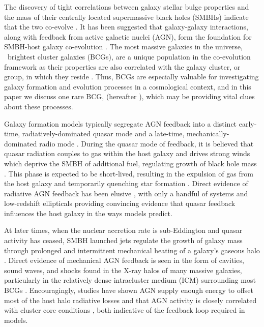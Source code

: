 \documentclass[useAMS,usenatbib]{mn2e}
\begin{document}
The discovery of tight correlations between galaxy stellar bulge
properties and the mass of their centrally located supermassive black
holes (SMBHs) indicate that the two co-evolve
\citep[\eg][]{1995ARA&A..33..581K, magorrian, 2000ApJ...539L...9F,
  2000ApJ...539L..13G, 2001ApJ...563L..11G}. It has been suggested
that galaxy-galaxy interactions, along with feedback from active
galactic nuclei (AGN), form the foundation for SMBH-host galaxy
co-evolution \citep[\eg][]{1995MNRAS.276..663B, 1998A&A...331L...1S,
  2000MNRAS.311..576K, 2001MNRAS.324..757G}. The most massive galaxies
in the universe, \eg\ brightest cluster galaxies (BCGs), are a unique
population in the co-evolution framework as their properties are also
correlated with the galaxy cluster, or group, in which they reside
\citep[\eg][]{1984ApJ...276...38J, 1998ApJ...502..141D}. Thus, BCGs
are especially valuable for investigating galaxy formation and
evolution processes in a cosmological context, and in this paper we
discuss one rare BCG, \object{\inine} (hereafter \irs), which may be
providing vital clues about these processes.

Galaxy formation models typically segregate AGN feedback into a
distinct early-time, radiatively-dominated quasar mode
\citep[\eg][]{2005Natur.435..629S, 2006ApJS..163....1H} and a
late-time, mechanically-dominated radio mode \citep[\eg][]{croton06,
  bower06}. During the quasar mode of feedback, it is believed that
quasar radiation couples to gas within the host galaxy and drives
strong winds which deprive the SMBH of additional fuel, regulating
growth of black hole mass \citep[\eg][]{2005ApJ...630..705H,
  2005Natur.433..604D}. This phase is expected to be short-lived,
resulting in the expulsion of gas from the host galaxy and temporarily
quenching star formation \citep[\eg][]{2006ApJ...642L.107N,
  2008ApJ...686..219M}. Direct evidence of radiative AGN feedback has
been elusive \citep[see][for a review]{2005ARA&A..43..769V}, with only
a handful of systems \citep[\eg][]{2008A&A...492...81P,
  2010A&A...518L.155F} and low-redshift ellipticals
\citep{2009ApJ...690.1672S} providing convincing evidence that quasar
feedback influences the host galaxy in the ways models predict.

At later times, when the nuclear accretion rate is sub-Eddington and
quasar activity has ceased, SMBH launched jets regulate the growth of
galaxy mass through prolonged and intermittent mechanical heating of a
galaxy's gaseous halo \citep[\eg][]{2005MNRAS.363....2K,
  2006MNRAS.368....2D}. Direct evidence of mechanical AGN feedback is
seen in the form of cavities, sound waves, and shocks found in the
X-ray halos of many massive galaxies, particularly in the relatively
dense intracluster medium (ICM) surrounding most BCGs
\citep[\eg][]{perseus1, hydraa0, 2001ApJ...554..261C,
  2007ApJ...665.1057F, 2008MNRAS.390L..93S}. Encouragingly, studies
have shown AGN supply enough energy to offset most of the host halo
radiative losses \citep[\eg][]{perseus2, birzan04, dunn06} and that
AGN activity is closely correlated with cluster core conditions
\citep[\eg][]{haradent, rafferty08}, both indicative of the feedback
loop required in models.
\end{document}
